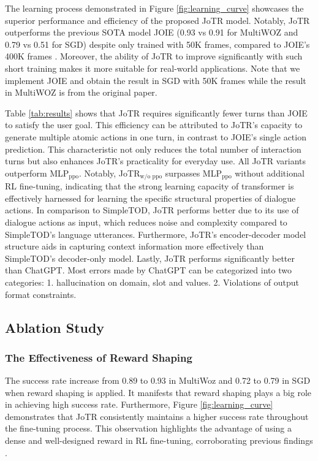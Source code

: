 \documentclass[letterpaper]{article} %
\begin{document}
The learning process demonstrated in Figure \ref{fig:learning_curve} showcases the superior performance and efficiency of the proposed JoTR model. 
Notably, JoTR outperforms the previous SOTA model JOIE (0.93 vs 0.91 for MultiWOZ and 0.79 vs 0.51 for SGD) despite only trained with 50K frames, compared to JOIE's 400K frames \cite{wang-wong-2021-collaborative}. Moreover, the ability of JoTR to improve significantly with such short training makes it more suitable for real-world applications. Note that we implement JOIE and obtain the result in SGD with 50K frames while the result in MultiWOZ is from the original paper. 

Table \ref{tab:results} shows that JoTR requires significantly fewer turns than JOIE to satisfy the user goal. 
This efficiency can be attributed to JoTR's capacity to generate multiple atomic actions in one turn, in contrast to JOIE's single action prediction. This characteristic not only reduces the total number of interaction turns but also enhances JoTR's practicality for everyday use. All JoTR variants outperform MLP$_{\text{ppo}}$. Notably, JoTR$_\text{w/o ppo}$ surpasses MLP$_{\text{ppo}}$ without additional RL fine-tuning, indicating that the strong learning capacity of transformer is effectively harnessed for learning the specific structural properties of dialogue actions. In comparison to SimpleTOD, JoTR performs better due to its use of dialogue actions as input, which reduces noise and complexity compared to SimpleTOD's language utterances. 
Furthermore, JoTR's encoder-decoder model structure aids in capturing context information more effectively than SimpleTOD's decoder-only model. Lastly, JoTR performs significantly better than ChatGPT. Most errors made by ChatGPT can be categorized into two categories: 1. hallucination on domain, slot and values. 2. Violations of output format constraints. 

\subsection{Ablation Study}
\subsubsection{The Effectiveness of Reward Shaping}
The success rate increase from 0.89 to 0.93 in MultiWoz and 0.72 to 0.79 in SGD when reward shaping is applied. It manifests that reward shaping plays a big role in achieving high success rate. Furthermore, Figure \ref{fig:learning_curve} demonstrates that JoTR consistently maintains a higher success rate throughout the fine-tuning process.  
This observation highlights the advantage of using a dense and well-designed reward in RL fine-tuning, corroborating previous findings \cite{wang2022integrating}.
\end{document}
